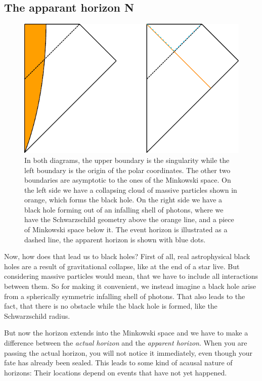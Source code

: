 \subsection{The apparant horizon N}
	\begin{figure}[tbp] 
		\begin{center}
			\includegraphics[scale=1]{collapse}
		\end{center}
			\caption{In both diagrams, the upper boundary is the singularity while the left boundary is the origin of the polar coordinates. The other two boundaries are asymptotic to the ones of the Minkowski space. On the left side we have a collapsing cloud of massive particles shown in orange, which forms the black hole. On the right side we have a black hole forming out of an infalling shell of photons, where we have the Schwarzschild geometry above the orange line, and a piece of Minkowski space below it. The event horizon is illustrated as a dashed line, the apparent horizon is shown with blue dots.}\label{collapse}
	\end{figure}	
	Now, how does that lead us to black holes? First of all, real astrophysical black holes are a result of gravitational collapse, like at the end of a star live. But considering massive particles would mean, that we have to include all interactions between them. So for making it convenient, we instead imagine a black hole arise from a spherically symmetric infalling shell of photons. 
	That also leads to the fact, that there is no obstacle while the black hole is formed, like the Schwarzschild radius.
		
	But now the horizon extends into the Minkowski space and we have to make a difference between the \textit{actual horizon} and the \textit{apparent horizon}.
	When you are passing the actual horizon, you will not notice it immediately, even though your fate has already been sealed. This leads to some kind of acausal nature of horizons: Their locations depend on events that have not yet happened. 
	
